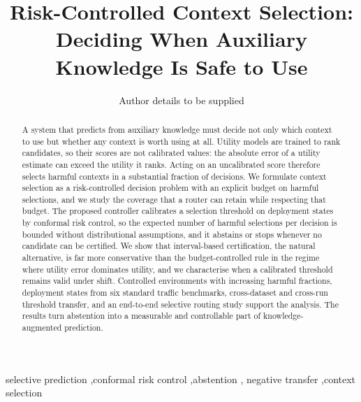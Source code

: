 \documentclass[preprint,12pt]{elsarticle}
\theoremstyle{definition}
\begin{document}
\begin{frontmatter}
\title{Risk-Controlled Context Selection: Deciding When Auxiliary Knowledge Is Safe to Use}
\author{Author details to be supplied}
\begin{abstract}
A system that predicts from auxiliary knowledge must decide not only which
context to use but whether any context is worth using at all. Utility models
are trained to rank candidates, so their scores are not calibrated values: the
absolute error of a utility estimate can exceed the utility it ranks. Acting on
an uncalibrated score therefore selects harmful contexts in a substantial
fraction of decisions. We formulate context selection as a risk-controlled
decision problem with an explicit budget on harmful selections, and we study
the coverage that a router can retain while respecting that budget. The
proposed controller calibrates a selection threshold on deployment states by
conformal risk control, so the expected number of harmful selections per
decision is bounded without distributional assumptions, and it abstains or
stops whenever no candidate can be certified. We show that interval-based
certification, the natural alternative, is far more conservative than the
budget-controlled rule in the regime where utility error dominates utility,
and we characterise when a calibrated threshold remains valid under shift.
Controlled environments with increasing harmful fractions, deployment states
from six standard traffic benchmarks, cross-dataset and cross-run threshold
transfer, and an end-to-end selective routing study support the analysis. The
results turn abstention into a measurable and controllable part of
knowledge-augmented prediction.
\end{abstract}
\begin{keyword}
selective prediction \sep conformal risk control \sep abstention \sep
negative transfer \sep context selection
\end{keyword}
\end{frontmatter}












\end{document}
